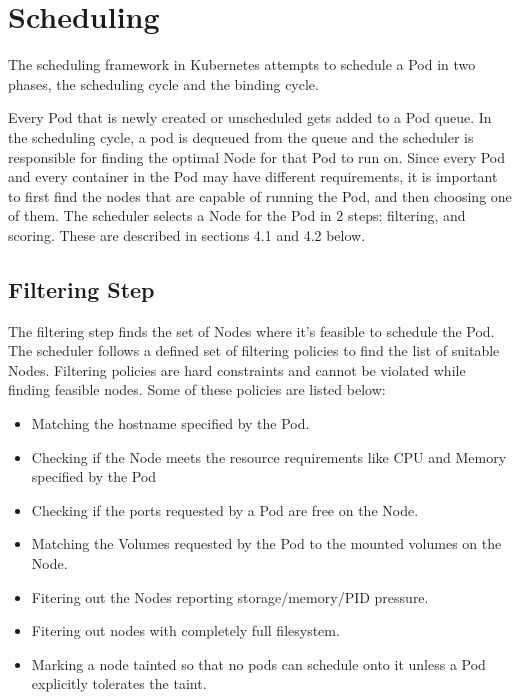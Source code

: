 \documentclass[sigconf]{acmart}
\begin{document}
\section{Scheduling}

The scheduling framework in Kubernetes attempts to schedule a Pod in two phases, the scheduling cycle and the binding cycle. 

Every Pod that is newly created or unscheduled gets added to a Pod queue. In the scheduling cycle, a pod is dequeued from the queue and the scheduler is responsible for finding the optimal Node for that Pod to run on. Since every Pod and every container in the Pod may have different requirements, it is important to first find the nodes that are capable of running the Pod, and then choosing one of them. The scheduler selects a Node for the Pod in 2 steps: filtering, and scoring. These are described in sections 4.1 and 4.2 below.

\subsection{Filtering Step}
The filtering step finds the set of Nodes where it’s feasible to schedule the Pod. The scheduler follows a defined set of filtering policies to find the list of suitable Nodes. Filtering policies are hard constraints and cannot be violated while finding feasible nodes. Some of these policies are listed below:
\begin{itemize}
\item Matching the hostname specified by the Pod.
\item Checking if the Node meets the resource requirements like CPU and Memory specified by the Pod
\item Checking if the ports requested by a Pod are free on the Node.
\item Matching the Volumes requested by the Pod to the mounted volumes on the Node.
\item Fitering out the Nodes reporting storage/memory/PID pressure.
\item Fitering out nodes with completely full filesystem.
\item Marking a node tainted so that no pods can schedule onto it unless a Pod explicitly tolerates the taint.
\end{itemize}
\end{document}
